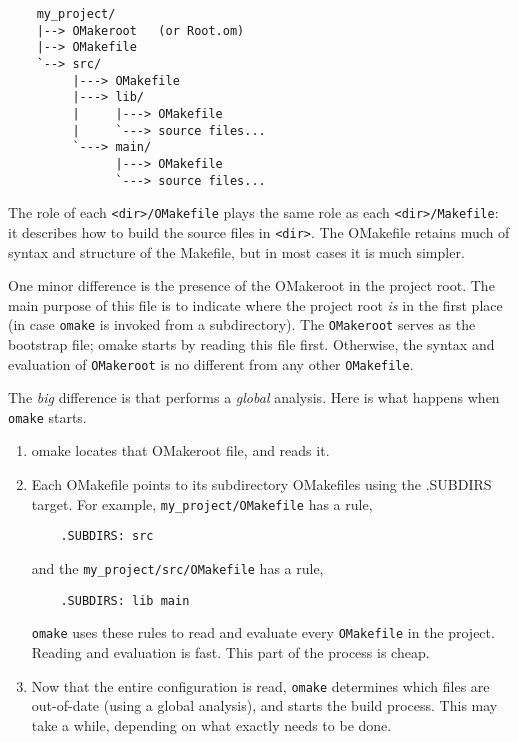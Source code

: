 \begin{verbatim}
    my_project/
    |--> OMakeroot   (or Root.om)
    |--> OMakefile
    `--> src/
         |---> OMakefile
         |---> lib/
         |     |---> OMakefile
         |     `---> source files...
         `---> main/
               |---> OMakefile
               `---> source files...
\end{verbatim}

The role of each \verb+<dir>/OMakefile+ plays the same role as each \verb+<dir>/Makefile+: it
describes how to build the source files in \verb+<dir>+.  The OMakefile retains much of syntax and
structure of the Makefile, but in most cases it is much simpler.

One minor difference is the presence of the OMakeroot in the project root.  The main purpose of this
file is to indicate where the project root \emph{is} in the first place (in case \verb+omake+ is
invoked from a subdirectory).  The \verb+OMakeroot+ serves as the bootstrap file; omake starts by
reading this file first.  Otherwise, the syntax and evaluation of \verb+OMakeroot+ is no different
from any other \verb+OMakefile+.

The \emph{big} difference is that \OMake{} performs a \emph{global} analysis.  Here is what happens
when \verb+omake+ starts.

\begin{enumerate}
\item omake locates that OMakeroot file, and reads it.
\item Each OMakefile points to its subdirectory OMakefiles using the .SUBDIRS target.
For example, \verb+my_project/OMakefile+ has a rule,

\begin{verbatim}
    .SUBDIRS: src
\end{verbatim}

and the \verb+my_project/src/OMakefile+ has a rule,

\begin{verbatim}
    .SUBDIRS: lib main
\end{verbatim}

\verb+omake+ uses these rules to read and evaluate every \verb+OMakefile+ in the project.
Reading and evaluation is fast.  This part of the process is cheap.

\item Now that the entire configuration is read, \verb+omake+ determines which files are out-of-date
(using a global analysis), and starts the build process.  This may take a while, depending on what
exactly needs to be done.
\end{enumerate}


